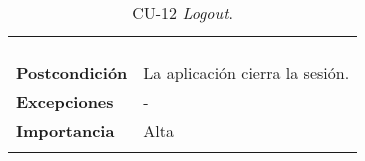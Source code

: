\begin{longtable}[H]{@{}ll@{}}
\begin{minipage}[t]{0.71\columnwidth}
\begin{enumerate}
\end{enumerate}\strut
\end{minipage}\tabularnewline
\begin{minipage}[t]{0.23\columnwidth}\raggedright\strut
\textbf{Postcondición}\strut
\end{minipage} & \begin{minipage}[t]{0.71\columnwidth}\raggedright\strut
La aplicación cierra la sesión.
\end{minipage}\tabularnewline
\begin{minipage}[t]{0.23\columnwidth}\raggedright\strut
\textbf{Excepciones}\strut
\end{minipage} & \begin{minipage}[t]{0.71\columnwidth}\raggedright\strut
-\strut
\end{minipage}\tabularnewline
\begin{minipage}[t]{0.23\columnwidth}\raggedright\strut
\textbf{Importancia}\strut
\end{minipage} & \begin{minipage}[t]{0.71\columnwidth}\raggedright\strut
Alta\strut
\end{minipage}\tabularnewline
\bottomrule
\caption{CU-12 \emph{Logout}.}
\end{longtable}
\strut


